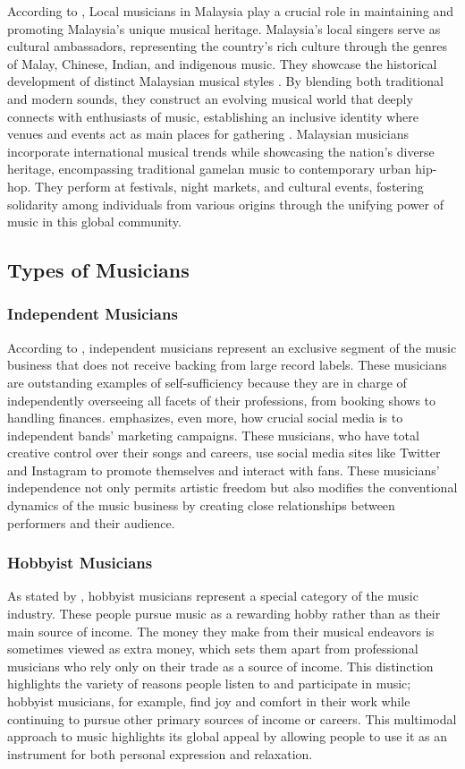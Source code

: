 According to \textcite{mohd21}, Local musicians in Malaysia play a crucial role in maintaining and promoting Malaysia's unique musical heritage. Malaysia's local singers serve as cultural ambassadors, representing the country's rich culture through the genres of Malay, Chinese, Indian, and indigenous music. They showcase the historical development of distinct Malaysian musical styles \parencite{mohd21}. By blending both traditional and modern sounds, they construct an evolving musical world that deeply connects with enthusiasts of music, establishing an inclusive identity where venues and events act as main places for gathering \parencite{ong19}. Malaysian musicians incorporate international musical trends while showcasing the nation's diverse heritage, encompassing traditional gamelan music to contemporary urban hip-hop. They perform at festivals, night markets, and cultural events, fostering solidarity among individuals from various origins through the unifying power of music in this global community.

\subsection{Types of Musicians}
\subsubsection{Independent Musicians}
According to \textcite{arditi21}, independent musicians represent an exclusive segment of the music business that does not receive backing from large record labels. These musicians are outstanding examples of self-sufficiency because they are in charge of independently overseeing all facets of their professions, from booking shows to handling finances. \textcite{martinez21} emphasizes, even more, how crucial social media is to independent bands' marketing campaigns. These musicians, who have total creative control over their songs and careers, use social media sites like Twitter and Instagram to promote themselves and interact with fans. These musicians' independence not only permits artistic freedom but also modifies the conventional dynamics of the music business by creating close relationships between performers and their audience.

\subsubsection{Hobbyist Musicians}
As stated by \textcite{arditi21}, hobbyist musicians represent a special category of the music industry. These people pursue music as a rewarding hobby rather than as their main source of income. The money they make from their musical endeavors is sometimes viewed as extra money, which sets them apart from professional musicians who rely only on their trade as a source of income. This distinction highlights the variety of reasons people listen to and participate in music; hobbyist musicians, for example, find joy and comfort in their work while continuing to pursue other primary sources of income or careers. This multimodal approach to music highlights its global appeal by allowing people to use it as an instrument for both personal expression and relaxation.


